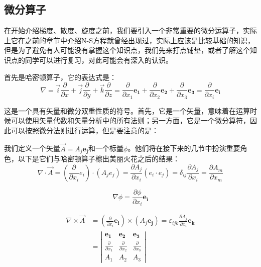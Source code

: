 \documentclass{ctexart}
\begin{document}
\subsection{微分算子}
在开始介绍梯度、散度、旋度之前，我们要引入一个非常重要的微分运算子，实际上它在之前的章节中介绍N-S方程就曾经出现过，实际上应该是比较基础的知识，但是为了避免有人可能没有掌握这个知识点，我们先来打点铺垫，或者了解这个知识点的同学可以进行复习，对此可能会有深入的认识。
\par
首先是哈密顿算子，它的表达式是：
$$
\nabla =\vec{i} \frac{\partial}{\partial x}+\vec{j} \frac{\partial}{\partial y}+\vec{k} \frac{\partial}{\partial z} 
=\frac{\partial}{\partial x_{1}} \boldsymbol{e_{1}}+\frac{\partial}{\partial x_{2}} \boldsymbol{e_{2}}+\frac{\partial}{\partial x_{3}} \boldsymbol{e_{3}}=\frac{\partial}{\partial x_{i}} \boldsymbol{e_{i}}
$$
\par
这是一个具有矢量和微分双重性质的符号。首先，它是一个矢量，意味着在运算时候可以使用矢量代数和矢量分析中的所有法则；另一方面，它是一个微分算符，因此可以按照微分法则进行运算，但是要注意的是：
\par
我们定义一个矢量$\vec{A}=A_j\boldsymbol{e_{j}}$和一个标量$\phi$。他们将在接下来的几节中扮演重要角色，以下是它们与哈密顿算子檫出美丽火花之后的结果：
$$
\nabla \cdot \vec{A} =\left(\frac{\partial}{\partial x_{i}} e_{i}\right) \cdot\left(A_{j} e_{j}\right)
=\frac{\partial A_{j}}{\partial x_{i}}\left(e_{i} \cdot e_{j}\right)=\delta_{i j} \frac{\partial A_{j}}{\partial x_{i}}=\frac{\partial A_{m}}{\partial x_{m}}
$$

$$
\nabla \phi = \frac{\partial \phi}{ \partial x_{i}} \boldsymbol{e_{i}}
$$

$$
\begin{aligned}
\nabla \times \vec{A} &=\left(\frac{\partial}{\partial x_{i}} \boldsymbol{e_{i}}\right) \times\left(A_{j} \boldsymbol{e_{j}}\right)=\varepsilon_{i j k} \frac{\partial A_{j}}{\partial x_{i}} \boldsymbol{e_{k}} \\
&=\left|\begin{array}{ccc}
\boldsymbol{e_{1}} & \boldsymbol{e_{2}} & \boldsymbol{e_{3}} \\
\frac{\partial}{\partial x_{1}} & \frac{\partial}{\partial x_{2}} & \frac{\partial}{\partial x_{3}} \\
A_{1} & A_{2} & A_{3}
\end{array}\right|
\end{aligned}
$$
\end{document}
